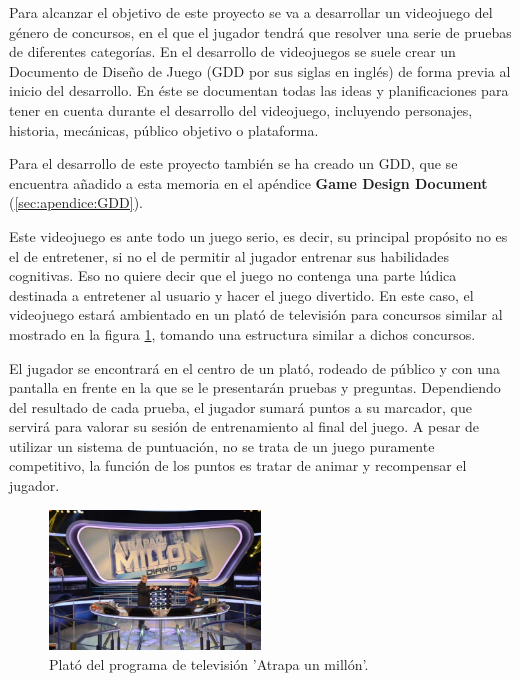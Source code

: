 
\minitoc


Para alcanzar el objetivo de este proyecto se va a desarrollar un videojuego del género de concursos, en el que el jugador tendrá que resolver una serie de pruebas de diferentes categorías. En el desarrollo de videojuegos se suele crear un Documento de Diseño de Juego (GDD por sus siglas en inglés) de forma previa al inicio del desarrollo. En éste se documentan todas las ideas y planificaciones para tener en cuenta durante el desarrollo del videojuego, incluyendo personajes, historia, mecánicas, público objetivo o plataforma. 

Para el desarrollo de este proyecto también se ha creado un GDD, que se encuentra añadido a esta memoria en el apéndice \textbf{Game Design Document} (\ref{sec:apendice:GDD}).

Este videojuego es ante todo un juego serio, es decir, su principal propósito no es el de entretener, si no el de permitir al jugador entrenar sus habilidades cognitivas. Eso no quiere decir que el juego no contenga una parte lúdica destinada a entretener al usuario y hacer el juego divertido. En este caso, el videojuego estará ambientado en un plató de televisión para concursos similar al mostrado en la figura \ref{fig:AI_atrapaMillon}, tomando una estructura similar a dichos concursos. 

El jugador se encontrará en el centro de un plató, rodeado de público y con una pantalla en frente en la que se le presentarán pruebas y preguntas. Dependiendo del resultado de cada prueba, el jugador sumará puntos a su marcador, que servirá para valorar su sesión de entrenamiento al final del juego. A pesar de utilizar un sistema de puntuación, no se trata de un juego puramente competitivo, la función de los puntos es tratar de animar y recompensar el jugador.

\begin{figure}
  \centering
    \includegraphics[width=0.5\textwidth]{03.EstudioProblema/02.AnalisisInicial/00.Figuras/01.atrapa_un_millon.jpg}
    \caption{Plató del programa de televisión 'Atrapa un millón'. \cite{AI_img_atrapaMillon}}
    \label{fig:AI_atrapaMillon}
\end{figure}

